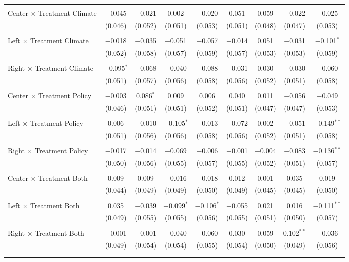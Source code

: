 \begin{tabular}{@{\extracolsep{5pt}}lcccccccc}
  & & & & & & & & \\ 
 Center $\times$ Treatment Climate & $-$0.045 & $-$0.021 & 0.002 & $-$0.020 & 0.051 & 0.059 & $-$0.022 & $-$0.025 \\ 
  & (0.046) & (0.052) & (0.051) & (0.053) & (0.051) & (0.048) & (0.047) & (0.053) \\ 
  & & & & & & & & \\ 
 Left $\times$ Treatment Climate & $-$0.018 & $-$0.035 & $-$0.051 & $-$0.057 & $-$0.014 & 0.051 & $-$0.031 & $-$0.101$^{*}$ \\ 
  & (0.052) & (0.058) & (0.057) & (0.059) & (0.057) & (0.053) & (0.053) & (0.059) \\ 
  & & & & & & & & \\ 
 Right $\times$ Treatment Climate & $-$0.095$^{*}$ & $-$0.068 & $-$0.040 & $-$0.088 & $-$0.031 & 0.030 & $-$0.030 & $-$0.060 \\ 
  & (0.051) & (0.057) & (0.056) & (0.058) & (0.056) & (0.052) & (0.051) & (0.058) \\ 
  & & & & & & & & \\ 
 Center $\times$ Treatment Policy & $-$0.003 & 0.086$^{*}$ & 0.009 & 0.006 & 0.040 & 0.011 & $-$0.056 & $-$0.049 \\ 
  & (0.046) & (0.051) & (0.051) & (0.052) & (0.051) & (0.047) & (0.047) & (0.053) \\ 
  & & & & & & & & \\ 
 Left $\times$ Treatment Policy & 0.006 & $-$0.010 & $-$0.105$^{*}$ & $-$0.013 & $-$0.072 & 0.002 & $-$0.051 & $-$0.149$^{**}$ \\ 
  & (0.051) & (0.056) & (0.056) & (0.058) & (0.056) & (0.052) & (0.051) & (0.058) \\ 
  & & & & & & & & \\ 
 Right $\times$ Treatment Policy & $-$0.017 & $-$0.014 & $-$0.069 & $-$0.006 & $-$0.001 & $-$0.004 & $-$0.083 & $-$0.136$^{**}$ \\ 
  & (0.050) & (0.056) & (0.055) & (0.057) & (0.055) & (0.052) & (0.051) & (0.057) \\ 
  & & & & & & & & \\ 
 Center $\times$ Treatment Both & 0.009 & 0.009 & $-$0.016 & $-$0.018 & 0.012 & 0.001 & 0.035 & 0.019 \\ 
  & (0.044) & (0.049) & (0.049) & (0.050) & (0.049) & (0.045) & (0.045) & (0.050) \\ 
  & & & & & & & & \\ 
 Left $\times$ Treatment Both & 0.035 & $-$0.039 & $-$0.099$^{*}$ & $-$0.106$^{*}$ & $-$0.055 & 0.021 & 0.016 & $-$0.111$^{**}$ \\ 
  & (0.049) & (0.055) & (0.055) & (0.056) & (0.055) & (0.051) & (0.050) & (0.057) \\ 
  & & & & & & & & \\ 
 Right $\times$ Treatment Both & $-$0.001 & $-$0.001 & $-$0.040 & $-$0.060 & 0.030 & 0.059 & 0.102$^{**}$ & $-$0.036 \\ 
  & (0.049) & (0.054) & (0.054) & (0.055) & (0.054) & (0.050) & (0.049) & (0.056) \\ 
  & & & & & & & & \\ 
\hline \\[-1.8ex] 


\end{tabular}
